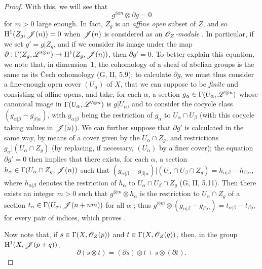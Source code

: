\begin{proof}
  With this, we will see that
  \[
  \label{II.4.5.13.2}
    g^{\otimes m}\otimes\partial g = 0
  \tag{4.5.13.2}
  \]
  for $m>0$ large enough.
  In fact, $Z_g$ is an \emph{affine open} subset of $Z$, and so $\mathrm{H}^1(Z_g,\mathscr{J}(n))=0$ when $\mathscr{J}(n)$ is considered as an \emph{$\mathscr{O}_Z$-module} .
  In particular, if we set $g'=g|Z_g$, and if we consider its image under the map $\partial:\Gamma(Z_g,\sh{L}'^{\otimes n})\to\HH^1(Z_g,\sh{J}(n))$, then $\partial g'=0$.
  To better explain this equation, we note that, in dimension~$1$, the cohomology of a sheaf of abelian groups is the same as its Čech cohomology (G, II, 5.9);
  to calculate $\partial g$, we must thus consider a fine-enough open cover $(U_\alpha)$ of $X$, that we can suppose to be \emph{finite} and consisting of affine opens, and take, for each $\alpha$, a section $g_\alpha\in\Gamma(U_\alpha,\mathscr{L}^{\otimes n})$ whose canonical image in $\Gamma(U_\alpha,\mathscr{L}'^{\otimes n})$ is $g|U_\alpha$, and to consider the cocycle class $(g_{\alpha|\beta}-g_{\beta|\alpha})$, with $g_{\alpha|\beta}$ being the restriction of $g_\alpha$ to $U_\alpha\cap U_\beta$ (with this cocycle taking values in $\mathscr{J}(n)$).
  We can further suppose that $\partial g'$ is calculated in the same way, by means of a cover given by the $U_\alpha\cap Z_g$, and restrictions $g_\alpha|(U_\alpha\cap Z_g)$ (by replacing, if necessary, $(U_\alpha)$ by a finer cover);
  the equation $\partial g'=0$ then implies that there exists, for each $\alpha$, a section $h_\alpha\in\Gamma(U_\alpha\cap Z_g,\mathscr{J}(n))$ such that $(g_{\alpha|\beta}-g_{\beta|\alpha})|(U_\alpha\cap U_\beta\cap Z_g) = h_{\alpha|\beta}-h_{\beta|\alpha}$, where $h_{\alpha|\beta}$ denotes the restriction of $h_\alpha$ to $U_\alpha\cap U_\beta\cap Z_g$ (G, II, 5.11).
  Then there exists an integer $m>0$ such that $g^{\otimes m}\otimes h_\alpha$ is the restriction to $U_\alpha\cap Z_g$ of a section $t_\alpha\in\Gamma(U_\alpha,\mathscr{J}(n+nm))$ for all $\alpha$ ;
  thus $g^{\otimes m}\otimes(g_{\alpha|\beta}-g_{\beta|\alpha})=t_{\alpha|\beta}-t_{\beta|\alpha}$ for every pair of indices, which proves .

  Now note that, if $s\in\Gamma(X,\mathscr{O}_Z(p))$ and $t\in\Gamma(X,\mathscr{O}_Z(q))$, then, in the group $\mathrm{H}^1(X,\mathscr{J}(p+q))$,
  \[
  \label{II.4.5.13.3}
    \partial(s\otimes t) = (\partial s)\otimes t + s\otimes(\partial t).
  \tag{4.5.13.3}
  \]


\end{proof}
